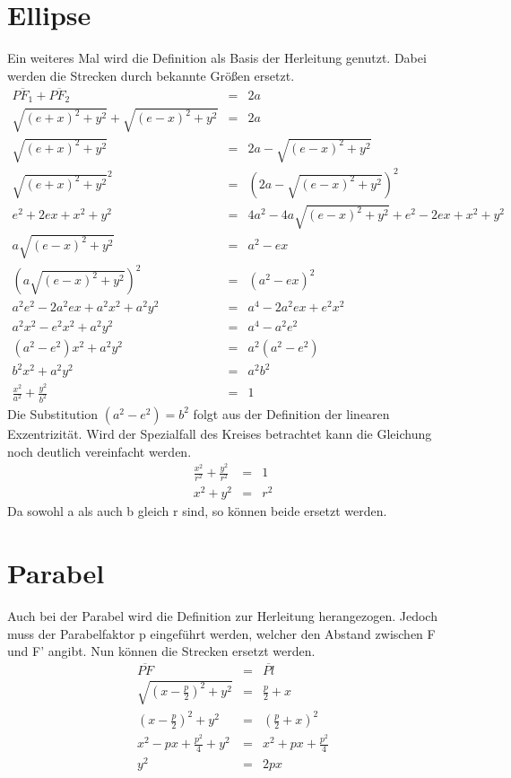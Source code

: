 \section{Ellipse}
Ein weiteres Mal wird die Definition als Basis der Herleitung genutzt. Dabei werden die Strecken durch bekannte Größen ersetzt.
\begin{displaymath}
	\begin{array}{rcl}
		\overline{{PF}_1} + \overline{{PF}_2}  & = & 2a\\
		\sqrt{{(e+x)}^2 + y^2} + \sqrt{{(e-x)}^2 + y^2} & = & 2a\\
		\sqrt{{(e+x)}^2 + y^2} & = & 2a - \sqrt{{(e-x)}^2 + y^2}\\
		\sqrt{{(e+x)}^2 + y^2}^2 & = & \left (2a - \sqrt{{(e-x)}^2 + y^2}\right )^2\\
		e^2 + 2ex + x^2 + y^2 & = & 4a^2 - 4a \sqrt{(e-x)^2+y^2} + e^2 - 2ex + x^2 + y^2\\
		a\sqrt{{(e-x)}^2 + y^2} & = & a^2 - ex\\
		\left (a\sqrt{{(e-x)}^2 + y^2}\right )^2 & = & (a^2 - ex)^2\\
		a^2e^2 - 2a^2ex + a^2x^2 + a^2y^2 &=& a^4 - 2a^2ex + e^2x^2\\
		a^2x^2 - e^2x^2 + a^2y^2 &=& a^4 - a^2e^2\\
		\left(a^2 - e^2\right)x^2 + a^2y^2 &=& a^2\left(a^2 - e^2\right)\\
		b^2x^2 + a^2y^2 &=& a^2b^2\\
		\frac{x^2}{a^2} + \frac{y^2}{b^2} &=& 1
	\end{array}
\end{displaymath}
Die Substitution $\left(a^2 - e^2\right) = b^2$ folgt aus der Definition der linearen Exzentrizität. Wird der Spezialfall des Kreises betrachtet kann die Gleichung noch deutlich vereinfacht werden.
\begin{displaymath}
	\begin{array}{rcl}
		\frac{x^2}{r^2} + \frac{y^2}{r^2} &=& 1\\
		x^2 + y^2 &=& r^2
	\end{array}
\end{displaymath}
Da sowohl a als auch b gleich r sind, so können beide ersetzt werden. 
\section{Parabel}
Auch bei der Parabel  wird die Definition zur Herleitung herangezogen. Jedoch muss der Parabelfaktor p eingeführt werden, welcher den Abstand zwischen F und F' angibt. Nun können die Strecken ersetzt werden.
\begin{displaymath}
	\begin{array}{rcl}
		\overline{PF} &=& \overline{Pl}\\
		\sqrt{\left(x-\frac{p}{2}\right)^2+y^2} &=& \frac{p}{2} + x\\
		\left(x-\frac{p}{2}\right)^2+y^2 &=& \left(\frac{p}{2} + x\right)^2\\
		x^2 - px + \frac{p^2}{4} + y^2 &=& x^2 + px + \frac{p^2}{4}\\
		y^2 &=& 2px
	\end{array}
\end{displaymath}
